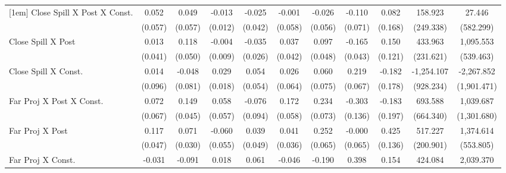 {\begin{tabular}{l*{10}{c}}
[1em]
Close Spill X Post X Const.&    0.052         &    0.049         &   -0.013         &   -0.025         &   -0.001         &   -0.026         &   -0.110         &    0.082         &  158.923         &   27.446         \\
                &  (0.057)         &  (0.057)         &  (0.012)         &  (0.042)         &  (0.058)         &  (0.056)         &  (0.071)         &  (0.168)         &(249.338)         &(582.299)         \\
[1em]
Close Spill X Post&    0.013         &    0.118\sym{**} &   -0.004         &   -0.035         &    0.037         &    0.097\sym{**} &   -0.165\sym{***}&    0.150         &  433.963\sym{*}  &1,095.553\sym{**} \\
                &  (0.041)         &  (0.050)         &  (0.009)         &  (0.026)         &  (0.042)         &  (0.048)         &  (0.043)         &  (0.121)         &(231.621)         &(539.463)         \\
[1em]
Close Spill X Const.&    0.014         &   -0.048         &    0.029         &    0.054         &    0.026         &    0.060         &    0.219\sym{***}&   -0.182         &-1,254.107         &-2,267.852         \\
                &  (0.096)         &  (0.081)         &  (0.018)         &  (0.054)         &  (0.064)         &  (0.075)         &  (0.067)         &  (0.178)         &(928.234)         &(1,901.471)         \\
[1em]
Far Proj X Post X Const.&    0.072         &    0.149\sym{***}&    0.058         &   -0.076         &    0.172\sym{***}&    0.234\sym{***}&   -0.303\sym{**} &   -0.183         &  693.588         &1,039.687         \\
                &  (0.067)         &  (0.045)         &  (0.057)         &  (0.094)         &  (0.058)         &  (0.073)         &  (0.136)         &  (0.197)         &(664.340)         &(1,301.680)         \\
[1em]
Far Proj X Post &    0.117\sym{**} &    0.071\sym{**} &   -0.060         &    0.039         &    0.041         &    0.252\sym{***}&   -0.000         &    0.425\sym{***}&  517.227\sym{**} &1,374.614\sym{**} \\
                &  (0.047)         &  (0.030)         &  (0.055)         &  (0.049)         &  (0.036)         &  (0.065)         &  (0.065)         &  (0.136)         &(200.901)         &(553.805)         \\
[1em]
Far Proj X Const.&   -0.031         &   -0.091         &    0.018         &    0.061         &   -0.046         &   -0.190\sym{*}  &    0.398\sym{***}&    0.154         &  424.084         &2,039.370         \\

\end{tabular}}
